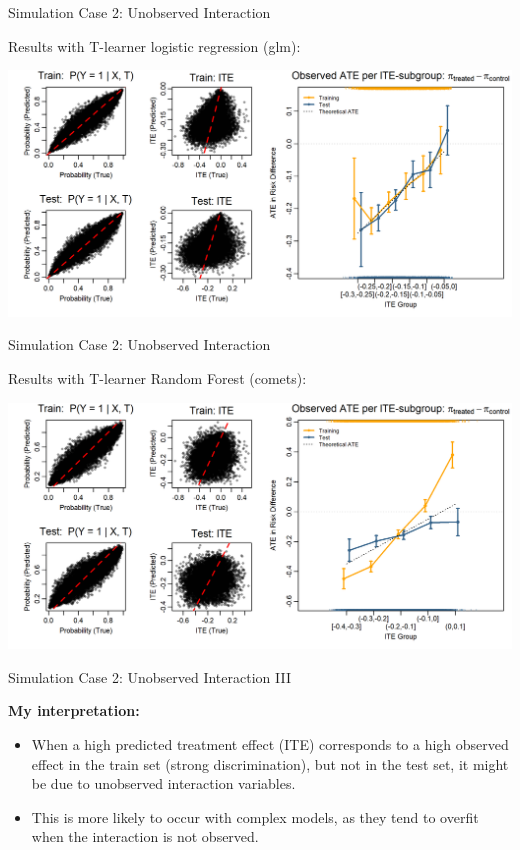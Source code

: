 \documentclass[onlytextwidth,english]{beamer}\usepackage[]{graphicx}\usepackage[]{xcolor}
\begin{document}
\begin{frame}{Simulation Case 2: Unobserved Interaction}

Results with T-learner logistic regression (glm):

\includegraphics[width=\textwidth]{img/unobserved_interaction_glm_tlearner.png}

\end{frame}

\begin{frame}{Simulation Case 2: Unobserved Interaction}

Results with T-learner Random Forest (comets):

\includegraphics[width=\textwidth]{img/unobserved_tuned_rf.png}

\end{frame}






\begin{frame}{Simulation Case 2: Unobserved Interaction III}

\textbf{My interpretation:} 
\begin{itemize}
    \item When a high predicted treatment effect (ITE) corresponds to a high observed effect in the train set (strong discrimination), but not in the test set, it might be due to unobserved interaction variables.
    \item This is more likely to occur with complex models, as they tend to overfit when the interaction is not observed.
\end{itemize}


\end{frame}
\end{document}
